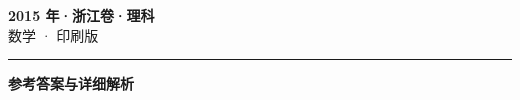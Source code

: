 \documentclass[zihao=5, a4paper]{ctexart}
\begin{document}
\begin{center}
  {\Large\bfseries 2015 年·浙江卷·理科}\\[4pt]
  {\large 数学 · 印刷版}
\end{center}
\medskip
{}

\par\bigskip\hrule\bigskip
{}
\begin{center}{\large\bfseries 参考答案与详细解析}\end{center}
\smallskip

\end{document}
